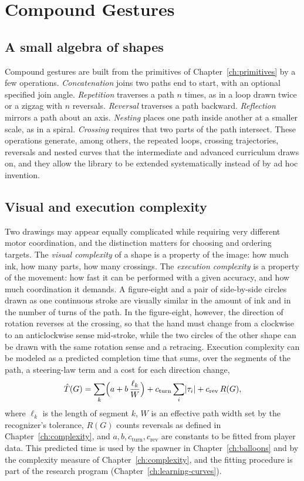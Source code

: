 \chapter{Compound Gestures}\label{ch:compound}

\section{A small algebra of shapes}

Compound gestures are built from the primitives of Chapter~\ref{ch:primitives} by a few operations. \emph{Concatenation} joins two paths end to start, with an optional specified join angle. \emph{Repetition} traverses a path $n$ times, as in a loop drawn twice or a zigzag with $n$ reversals. \emph{Reversal} traverses a path backward. \emph{Reflection} mirrors a path about an axis. \emph{Nesting} places one path inside another at a smaller scale, as in a spiral. \emph{Crossing} requires that two parts of the path intersect. These operations generate, among others, the repeated loops, crossing trajectories, reversals and nested curves that the intermediate and advanced curriculum draws on, and they allow the library to be extended systematically instead of by ad hoc invention.

\section{Visual and execution complexity}

Two drawings may appear equally complicated while requiring very different motor coordination, and the distinction matters for choosing and ordering targets. The \emph{visual complexity} of a shape is a property of the image: how much ink, how many parts, how many crossings. The \emph{execution complexity} is a property of the movement: how fast it can be performed with a given accuracy, and how much coordination it demands. A figure-eight and a pair of side-by-side circles drawn as one continuous stroke are visually similar in the amount of ink and in the number of turns of the path. In the figure-eight, however, the direction of rotation reverses at the crossing, so that the hand must change from a clockwise to an anticlockwise sense mid-stroke, while the two circles of the other shape can be drawn with the same rotation sense and a retracing. Execution complexity can be modeled as a predicted completion time that sums, over the segments of the path, a steering-law term and a cost for each direction change,
\[
\hat T(G)=\sum_{k}\Bigl(a+b\,\frac{\ell_k}{W}\Bigr)+c_{\mathrm{turn}}\sum_i\lvert \tau_i\rvert+c_{\mathrm{rev}}\,R(G),
\]
where $\ell_k$ is the length of segment $k$, $W$ is an effective path width set by the recognizer's tolerance, $R(G)$ counts reversals as defined in Chapter~\ref{ch:complexity}, and $a,b,c_{\mathrm{turn}},c_{\mathrm{rev}}$ are constants to be fitted from player data.\evH{} This predicted time is used by the spawner in Chapter~\ref{ch:balloons} and by the complexity measure of Chapter~\ref{ch:complexity}, and the fitting procedure is part of the research program (Chapter~\ref{ch:learning-curves}).

